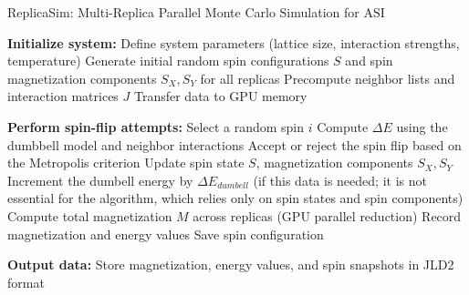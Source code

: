 \documentclass[journal=nalefd,manuscript=letter]{achemso}
\begin{document}
\begin{algorithm}[h!]
\caption{ReplicaSim: Multi-Replica Parallel Monte Carlo Simulation for ASI}
\label{alg:ReplicaSim}
\begin{algorithmic}[1]
    \State \textbf{Initialize system:}
    \State \quad Define system parameters (lattice size, interaction strengths, temperature)
    \State \quad Generate initial random spin configurations \( S \) and spin magnetization components \( S_X, S_Y \) for all replicas
    \State \quad Precompute neighbor lists and interaction matrices \( J \)
    \State \quad Transfer data to GPU memory

            \State \textbf{Perform spin-flip attempts:}
                \State Select a random spin \( i \)
                \State Compute \( \Delta E \) using the dumbbell model and neighbor interactions
                \State Accept or reject the spin flip based on the Metropolis criterion
                    \State Update spin state \( S \), magnetization components \( S_X, S_Y \)
                     \State Increment the dumbell energy by  \( \Delta E_{dumbell} \) (if this data is needed; 
                     \State it is not essential for the algorithm, which relies only on spin states 
                     \State and spin components)
                \EndIf
            \EndFor
            \State Compute total magnetization \( M \) across replicas (GPU parallel reduction)
        \EndFor
        \State Record magnetization and energy values
            \State Save spin configuration
        \EndIf
    \EndFor

    \State \textbf{Output data:}
    \State Store magnetization, energy values, and spin snapshots in JLD2 format
\end{algorithmic}
\end{algorithm}



\end{document}
